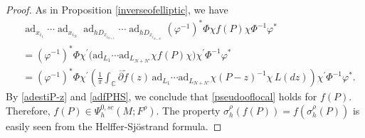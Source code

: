 \documentclass[11pt,oneside,reqno]{amsart}
\newcommand\R{\ensuremath{\mathbb{R}}}
\newcommand\C{\ensuremath{\mathbb{C}}}
\theoremstyle{definition}
\numberwithin{equation}{section}
\theoremstyle{plain}
\begin{document}
\begin{proof}


As in Proposition \ref{inverseofelliptic}, we have
\begin{equation}\label{adfPHS}
\begin{aligned}
&\operatorname{ad}_{x_{i_1}} \cdots \operatorname{ad}_{x_{i_N}} \operatorname{ad}_{hD_{x_{i_{N+1}}}} \cdots \operatorname{ad}_{hD_{x_{i_{N+N^\prime}}}} (\varphi^{-1})^*\Phi \chi f(P)\chi\Phi^{-1}\varphi^*\\
&=(\varphi^{-1})^*\Phi \chi^{\prime} \big(\mathrm{ad}_{L_1}\cdots \mathrm{ad}_{L_{N+N'}} \chi f(P)\chi \big)\chi^{\prime}\Phi^{-1}\varphi^*\\
&= (\varphi^{-1})^*\Phi \chi^{\prime} \left(\frac{1}{\pi }\int_{\C}\overline{\partial}\widetilde{f}(z)\,\mathrm{ad}_{L_1}\cdots \mathrm{ad}_{L_{N+N'}} \chi (P-z)^{-1}\chi \,L(dz)\right)\chi^{\prime}\Phi^{-1}\varphi^*.
\end{aligned}
\end{equation}
By \eqref{adestiP-z} and \eqref{adfPHS}, we conclude that \eqref{pseudooflocal} holds for $f(P)$. Therefore, $f(P)\in \Psi^{0,sc}_{h}(M;F^\rho)$. The property $\sigma_{h}^{\rho}(f(P))=f(\sigma_{h}^{\rho}(P))$ is easily seen from the Helffer-Sj\"{o}strand formula.


\end{proof}
\end{document}
